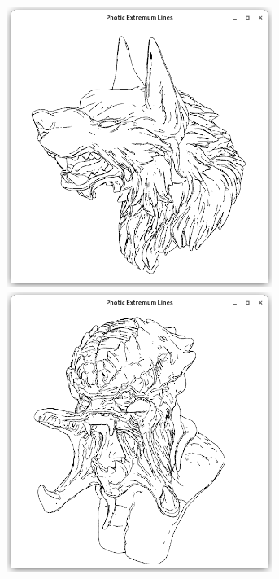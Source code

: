 \documentclass[9pt,fleqn,twoside,twocolumn]{stdglobal}
\begin{document}
\begin{figure}
\begin{subfigure}[t]{0.19\textwidth}
        \includegraphics[width=0.95\textwidth,trim={15px 15 15 50},clip]{images/results/werewolf-contours-pel.png}
        \includegraphics[width=0.95\textwidth,trim={15px 15 15 50},clip]{images/results/predator-contours-pel.png}

\end{subfigure}
\end{figure}
\end{document}
